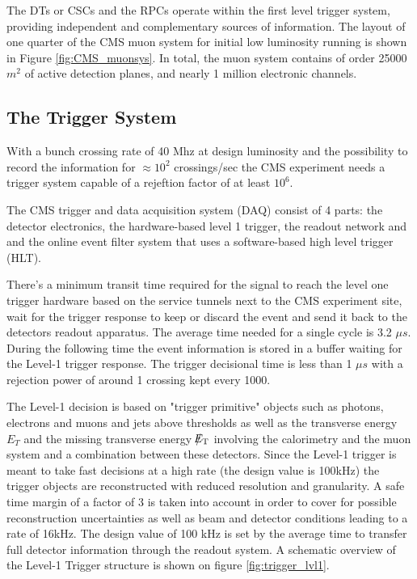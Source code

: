 The DTs or CSCs and the RPCs operate within the ﬁrst level trigger system, providing independent and complementary sources of information.
The layout of one quarter of the CMS muon system for initial low luminosity running is shown in Figure \ref{fig:CMS_muonsys}. In total, the muon system contains of order 25000 $m^{2}$ of active detection planes, and nearly 1 million electronic channels.

\clearpage

\subsection{The Trigger System}

With a bunch crossing rate of 40 Mhz at design luminosity and the possibility to record the information for $\approx 10^{2}$ crossings/sec the CMS experiment needs a trigger system capable of a rejeftion factor of at least $10^{6}$.

The CMS trigger and data acquisition system (DAQ) consist of 4 parts: the detector electronics, the hardware-based level 1 trigger, the readout network and and the online event filter system that uses a software-based high level trigger (HLT).

There's a minimum transit time required for the signal to reach the level one trigger hardware based on the service tunnels next to the CMS experiment site, wait for the trigger response to keep or discard the event and send it back to the detectors readout apparatus. The average time needed for a single cycle is 3.2 $\mu s$. During the following time the event information is stored in a buffer waiting for the Level-1 trigger response. The trigger decisional time is less than 1 $\mu s$ with a rejection power of around 1 crossing kept every 1000.

The Level-1 decision is based on "trigger primitive" objects such as photons, electrons and muons and jets above thresholds as well as the transverse energy $E_{T}$ and the missing transverse energy $\slash\mkern-12mu{E}_{\text{T}}$ involving the calorimetry and the muon system and a combination between these detectors. Since the Level-1 trigger is meant to take fast decisions at a high rate (the design value is 100kHz) the trigger objects are reconstructed with reduced resolution and granularity. A safe time margin of a factor of 3 is taken into account in order to cover for possible reconstruction uncertainties as well as beam and detector conditions leading to a rate of 16kHz. The design value of 100 kHz is set by the average time to transfer full detector information through the readout system. A schematic overview of the Level-1 Trigger structure is shown on figure \ref{fig:trigger_lvl1}.

